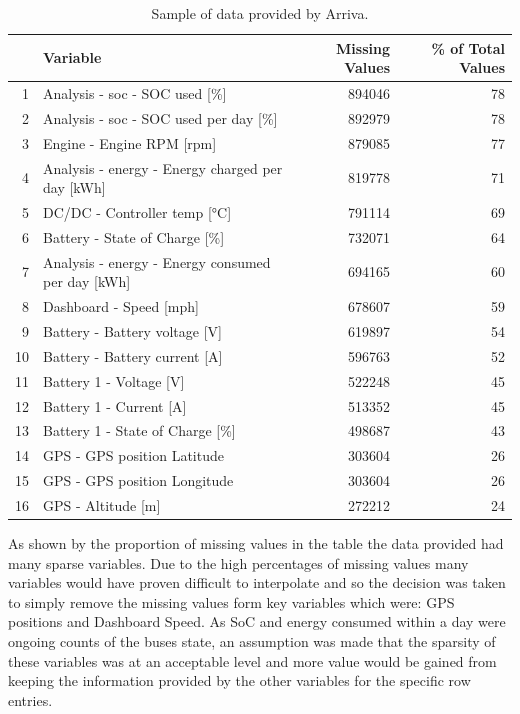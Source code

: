 \documentclass{article}
\begin{document}
\begin{table}[ht]
\centering
\begin{tabular}{rlrr}
  \hline
 & Variable & Missing Values & \% of Total Values \\ 
  \hline
1 & Analysis - soc - SOC used [\%] & 894046 & 78 \\ 
  2 & Analysis - soc - SOC used per day [\%] & 892979 & 78 \\ 
  3 & Engine - Engine RPM [rpm] & 879085 & 77 \\ 
  4 & Analysis - energy - Energy charged per day [kWh] & 819778 & 71 \\ 
  5 & DC/DC - Controller temp [°C] & 791114 & 69 \\ 
  6 & Battery - State of Charge [\%] & 732071 & 64 \\ 
  7 & Analysis - energy - Energy consumed per day [kWh] & 694165 & 60 \\ 
  8 & Dashboard - Speed [mph] & 678607 & 59 \\ 
  9 & Battery - Battery voltage [V] & 619897 & 54 \\ 
  10 & Battery - Battery current [A] & 596763 & 52 \\ 
  11 & Battery 1 - Voltage [V] & 522248 & 45 \\ 
  12 & Battery 1 - Current [A] & 513352 & 45 \\ 
  13 & Battery 1 - State of Charge [\%] & 498687 & 43 \\ 
  14 & GPS - GPS position Latitude & 303604 & 26 \\ 
  15 & GPS - GPS position Longitude & 303604 & 26 \\ 
  16 & GPS - Altitude [m] & 272212 & 24 \\ 
   \hline
\end{tabular}
\caption{Sample of data provided by Arriva.}
\label{table:1}
\end{table}

As shown by the proportion of missing values in the table the data provided had many sparse variables. Due to the high percentages of missing values many variables would have proven difficult to interpolate and so the decision was taken to simply remove the missing values form key variables which were: GPS positions and Dashboard Speed. As SoC and energy consumed within a day were ongoing counts of the buses state, an assumption was made that the sparsity of these variables was at an acceptable level and more value would be gained from keeping the information provided by the other variables for the specific row entries.
\end{document}
